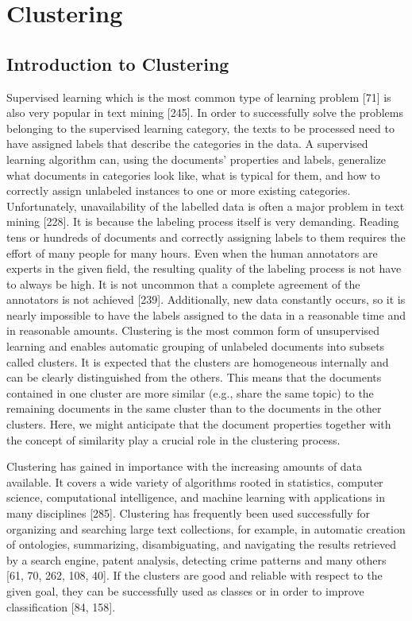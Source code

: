 \documentclass[11pt,openany,executivepaper]{book}
\begin{document}
\chapter{Clustering} %

\section{Introduction to Clustering}

Supervised learning which is the most common type of learning problem [71] is
also very popular in text mining [245]. In order to successfully solve the problems belonging to the supervised learning category, the texts to be processed
need to have assigned labels that describe the categories in the data. A supervised learning algorithm can, using the documents’ properties and labels, generalize what documents in categories look like, what is typical for them, and how
to correctly assign unlabeled instances to one or more existing categories.
Unfortunately, unavailability of the labelled data is often a major problem in
text mining [228]. It is because the labeling process itself is very demanding.
Reading tens or hundreds of documents and correctly assigning labels to them
requires the effort of many people for many hours. Even when the human annotators are experts in the given field, the resulting quality of the labeling process is
not have to always be high. It is not uncommon that a complete agreement of the
annotators is not achieved [239]. Additionally, new data constantly occurs, so it
is nearly impossible to have the labels assigned to the data in a reasonable time
and in reasonable amounts.
Clustering is the most common form of unsupervised learning and enables
automatic grouping of unlabeled documents into subsets called clusters. It is
expected that the clusters are homogeneous internally and can be clearly distinguished from the others. This means that the documents contained in one cluster
are more similar (e.g., share the same topic) to the remaining documents in the
same cluster than to the documents in the other clusters. Here, we might anticipate that the document properties together with the concept of similarity play a
crucial role in the clustering process.

Clustering has gained in importance with the increasing amounts of data
available. It covers a wide variety of algorithms rooted in statistics, computer
science, computational intelligence, and machine learning with applications in
many disciplines [285].
Clustering has frequently been used successfully for organizing and searching large text collections, for example, in automatic creation of ontologies, summarizing, disambiguating, and navigating the results retrieved by a search engine,
patent analysis, detecting crime patterns and many others [61, 70, 262, 108, 40].
If the clusters are good and reliable with respect to the given goal, they can be
successfully used as classes or in order to improve classification [84, 158].
\end{document}
